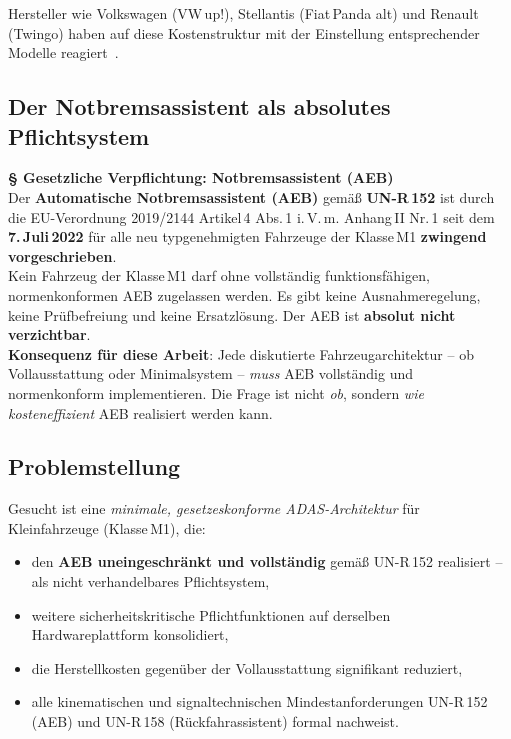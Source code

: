 \documentclass[a4paper,12pt]{article}
\theoremstyle{definition}
\begin{document}
Hersteller wie Volkswagen (VW\,up!), Stellantis (Fiat\,Panda alt) und
Renault (Twingo) haben auf diese Kostenstruktur mit der Einstellung
entsprechender Modelle reagiert~\cite{autozeitung2023end}.

\subsection{Der Notbremsassistent als absolutes Pflichtsystem}
\label{subsec:aeb_pflicht}

\begin{center}
\colorbox{lightred}{%
\begin{minipage}{0.88\textwidth}
\vspace{4pt}
\textcolor{accentred}{\textbf{\large\S{} Gesetzliche Verpflichtung: Notbremsassistent (AEB)}}\\[4pt]
Der \textbf{Automatische Notbremsassistent (AEB)} gem\"a\ss{} \textbf{UN-R\,152}
ist durch die EU-Verordnung 2019/2144 Artikel\,4 Abs.\,1 i.\,V.\,m.
Anhang\,II Nr.\,1 seit dem \textbf{7.\,Juli\,2022} f\"ur alle neu typgenehmigten
Fahrzeuge der Klasse\,M1 \textbf{zwingend vorgeschrieben}.\\[2pt]
Kein Fahrzeug der Klasse\,M1 darf ohne vollst\"andig funktionsf\"ahigen,
normenkonformen AEB zugelassen werden. Es gibt keine Ausnahmeregelung,
keine Pr\"ufbefreiung und keine Ersatzl\"osung. Der AEB ist
\textbf{absolut nicht verzichtbar}.\\[4pt]
\textbf{Konsequenz f\"ur diese Arbeit}: Jede diskutierte Fahrzeugarchitektur --
ob Vollausstattung oder Minimalsystem -- \emph{muss} AEB vollst\"andig
und normenkonform implementieren. Die Frage ist nicht \emph{ob}, sondern
\emph{wie kosteneffizient} AEB realisiert werden kann.
\vspace{4pt}
\end{minipage}}
\end{center}

\subsection{Problemstellung}

Gesucht ist eine \emph{minimale, gesetzeskonforme ADAS-Architektur} f\"ur
Kleinfahrzeuge (Klasse\,M1), die:

\begin{itemize}
  \item den \textbf{AEB uneingeschr\"ankt und vollst\"andig} gem\"a\ss{}
        UN-R\,152 realisiert -- als nicht verhandelbares Pflichtsystem,
  \item weitere sicherheitskritische Pflichtfunktionen auf derselben
        Hardwareplattform konsolidiert,
  \item die Herstellkosten gegen\"uber der Vollausstattung signifikant reduziert,
  \item alle kinematischen und signaltechnischen Mindestanforderungen
        UN-R\,152 (AEB) und UN-R\,158 (R\"uckfahrassistent) formal nachweist.
\end{itemize}
\end{document}
